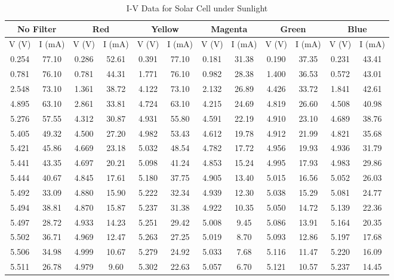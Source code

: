 \begin{table*}
    \centering
    \caption{I-V Data for Solar Cell under Sunlight}
    \begin{tabular}{|cc|cc|cc|cc|cc|cc|} \hline
    \multicolumn{2}{|c|}{No Filter} & \multicolumn{2}{c|}{Red} & \multicolumn{2}{c|}{Yellow} & \multicolumn{2}{c|}{Magenta} & \multicolumn{2}{c|}{Green} & \multicolumn{2}{c|}{Blue} \\ \hline
    V (V) & I (mA) & V (V) & I (mA) & V (V) & I (mA) & V (V) & I (mA) & V (V) & I (mA) & V (V) & I (mA) \\ \hline
    0.254 & 77.10 & 0.286 & 52.61 & 0.391 & 77.10 & 0.181 & 31.38 & 0.190 & 37.35 & 0.231 & 43.41 \\
    0.781 & 76.10 & 0.781 & 44.31 & 1.771 & 76.10 & 0.982 & 28.38 & 1.400 & 36.53 & 0.572 & 43.01 \\
    2.548 & 73.10 & 1.361 & 38.72 & 4.122 & 73.10 & 2.132 & 26.89 & 4.426 & 33.72 & 1.841 & 42.61 \\
    4.895 & 63.10 & 2.861 & 33.81 & 4.724 & 63.10 & 4.215 & 24.69 & 4.819 & 26.60 & 4.508 & 40.98 \\
    5.276 & 57.55 & 4.312 & 30.87 & 4.931 & 55.80 & 4.591 & 22.19 & 4.910 & 23.10 & 4.689 & 38.76 \\
    5.405 & 49.32 & 4.500 & 27.20 & 4.982 & 53.43 & 4.612 & 19.78 & 4.912 & 21.99 & 4.821 & 35.68 \\
    5.421 & 45.86 & 4.669 & 23.18 & 5.032 & 48.54 & 4.782 & 17.72 & 4.956 & 19.93 & 4.936 & 31.79 \\
    5.441 & 43.35 & 4.697 & 20.21 & 5.098 & 41.24 & 4.853 & 15.24 & 4.995 & 17.93 & 4.983 & 29.86 \\
    5.444 & 40.67 & 4.845 & 17.61 & 5.180 & 37.75 & 4.905 & 13.40 & 5.015 & 16.56 & 5.052 & 26.03 \\
    5.492 & 33.09 & 4.880 & 15.90 & 5.222 & 32.34 & 4.939 & 12.30 & 5.038 & 15.29 & 5.081 & 24.77 \\
    5.494 & 38.81 & 4.870 & 15.87 & 5.237 & 31.38 & 4.922 & 10.35 & 5.050 & 14.72 & 5.139 & 22.36 \\
    5.497 & 28.72 & 4.933 & 14.23 & 5.251 & 29.42 & 5.008 & 9.45 & 5.086 & 13.91 & 5.164 & 20.35 \\
    5.502 & 36.71 & 4.969 & 12.47 & 5.263 & 27.25 & 5.019 & 8.70 & 5.093 & 12.86 & 5.197 & 17.68 \\
    5.506 & 34.98 & 4.999 & 10.67 & 5.279 & 24.92 & 5.033 & 7.68 & 5.116 & 11.47 & 5.220 & 16.09 \\
    5.511 & 26.78 & 4.979 & 9.60 & 5.302 & 22.63 & 5.057 & 6.70 & 5.121 & 10.57 & 5.237 & 14.45 \\

\end{tabular}
\end{table*}
